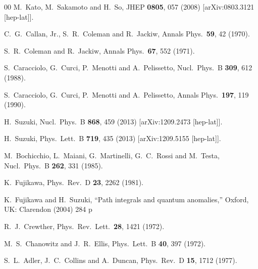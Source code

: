 \begin{thebibliography}{00}
  M.~Kato, M.~Sakamoto and H.~So,
  JHEP {\bf 0805}, 057 (2008)
  [arXiv:0803.3121 [hep-lat]].

  C.~G.~Callan, Jr., S.~R.~Coleman and R.~Jackiw,
  Annals Phys.\  {\bf 59}, 42 (1970).

  S.~R.~Coleman and R.~Jackiw,
  Annals Phys.\  {\bf 67}, 552 (1971).

  S.~Caracciolo, G.~Curci, P.~Menotti and A.~Pelissetto,
  Nucl.\ Phys.\ B {\bf 309}, 612 (1988).

  S.~Caracciolo, G.~Curci, P.~Menotti and A.~Pelissetto,
  Annals Phys.\  {\bf 197}, 119 (1990).

  H.~Suzuki,
  Nucl.\ Phys.\ B {\bf 868}, 459 (2013)
  [arXiv:1209.2473 [hep-lat]].

  H.~Suzuki,
  Phys.\ Lett.\ B {\bf 719}, 435 (2013)
  [arXiv:1209.5155 [hep-lat]].

  M.~Bochicchio, L.~Maiani, G.~Martinelli, G.~C.~Rossi and M.~Testa,
  Nucl.\ Phys.\ B {\bf 262}, 331 (1985).

  K.~Fujikawa,
  Phys.\ Rev.\ D {\bf 23}, 2262 (1981).

  K.~Fujikawa and H.~Suzuki,
  ``Path integrals and quantum anomalies,''
  Oxford, UK: Clarendon (2004) 284 p

  R.~J.~Crewther,
  Phys.\ Rev.\ Lett.\  {\bf 28}, 1421 (1972).

  M.~S.~Chanowitz and J.~R.~Ellis,
  Phys.\ Lett.\ B {\bf 40}, 397 (1972).

  S.~L.~Adler, J.~C.~Collins and A.~Duncan,
  Phys.\ Rev.\ D {\bf 15}, 1712 (1977).


\end{thebibliography}
